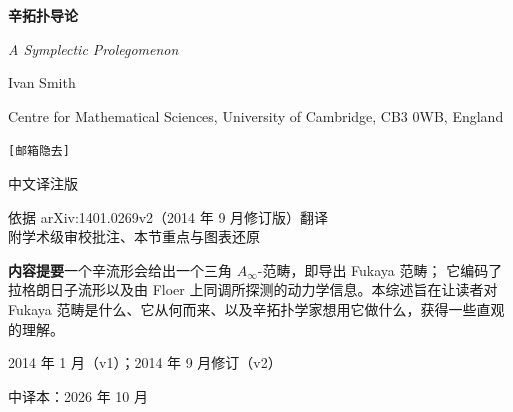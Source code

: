 \documentclass[11pt,a4paper]{article}
\numberwithin{equation}{section}
\begin{document}

\begin{titlepage}
\centering
\vspace*{2.2cm}

{\Huge\bfseries 辛拓扑导论\par}
\vspace{0.9em}
{\Large\itshape A Symplectic Prolegomenon\par}

\vspace{2.2em}
{\large Ivan Smith\par}
\vspace{0.4em}
{\small Centre for Mathematical Sciences, University of Cambridge, CB3 0WB, England\par}
\vspace{0.3em}
{\small\texttt{[邮箱隐去]}\par}

\vspace{2.6em}
\begin{minipage}{0.78\textwidth}
\centering
{\large 中文译注版\par}
\vspace{0.6em}
{\small 依据 arXiv:1401.0269v2（2014 年 9 月修订版）翻译\\
附学术级审校批注、本节重点与图表还原\par}
\end{minipage}

\vspace{2.4em}
\begin{minipage}{0.82\textwidth}
\small
\noindent\textbf{内容提要}\quad 一个辛流形会给出一个三角 $A_\infty$-范畴，即导出 Fukaya 范畴；
它编码了拉格朗日子流形以及由 Floer 上同调所探测的动力学信息。本综述旨在让读者对
Fukaya 范畴是什么、它从何而来、以及辛拓扑学家想用它做什么，获得一些直观的理解。
\end{minipage}

\vfill
{\small 2014 年 1 月（v1）；2014 年 9 月修订（v2）\par}
\vspace{0.4em}
{\small 中译本：2026 年 10 月\par}
\end{titlepage}
\end{document}
